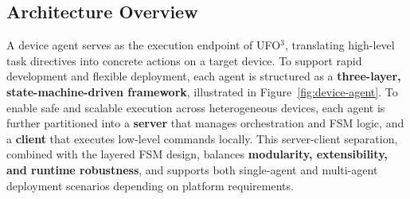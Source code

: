\documentclass[10pt]{article} %
\newcommand{\ufo}{\textsc{UFO}$^3$\xspace}
\begin{document}
\subsection{Architecture Overview}  
A device agent serves as the execution endpoint of \ufo, translating high-level task directives into concrete actions on a target device. To support rapid development and flexible deployment, each agent is structured as a \textbf{three-layer, state-machine-driven framework}, illustrated in Figure~\ref{fig:device-agent}. To enable safe and scalable execution across heterogeneous devices, each agent is further partitioned into a \textbf{server} that manages orchestration and FSM logic, and a \textbf{client} that executes low-level commands locally. This server-client separation, combined with the layered FSM design, balances \textbf{modularity, extensibility, and runtime robustness}, and supports both single-agent and multi-agent deployment scenarios depending on platform requirements.
\end{document}
